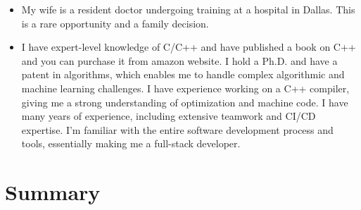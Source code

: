 \documentclass[a4paper,11pt,twoside]{book}
\begin{document}
\begin{itemize}
	\item My wife is a resident doctor undergoing training at a hospital in Dallas. This is a rare opportunity and a family decision.
	
	\item I have expert-level knowledge of C/C++ and have published a book on C++ and you can purchase it from amazon website. I hold a Ph.D. and have a patent in algorithms, which enables me to handle complex algorithmic and machine learning challenges. I have experience working on a C++ compiler, giving me a strong understanding of optimization and machine code. I have many years of experience, including extensive teamwork and CI/CD expertise. I’m familiar with the entire software development process and tools, essentially making me a full-stack developer. 
	
	
\end{itemize}

\iffalse

\chapter{Summary}
\end{document}
